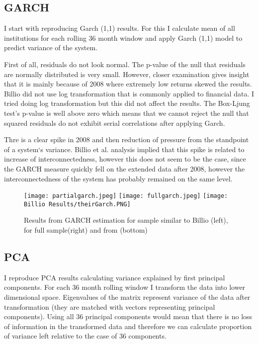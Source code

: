 \documentclass[preprint,pre,floats,aps,amsmath,amssymb]{revtex4}
\begin{document}
\subsection{GARCH}

I start with reproducing Garch (1,1) results.  For this I calculate mean of all institutions for each rolling 36 month window and apply Garch (1,1) model to predict variance of the system.

First of all, residuals do not look normal. The p-value of the null that residuals are normally distributed is very small. However, closer examination gives insight that it is mainly because of 2008 where extremely low returns skewed the results. Billio did not use log transformation that is commonly applied to financial data. I tried doing log transformation but this did not affect the results. 
The Box-Ljung test's p-value is well above zero which means that we cannot reject the null that squared residuals do not exhibit serial correlations after applying Garch. 

Thre is a clear spike in 2008 and then reduction of pressure from the standpoint of a system`s variance. Billio et al. analysis implied that this spike is related to increase of interconnectedness, however this does not seem to be the case, since the GARCH measure quickly fell on the extended data after 2008, however the interconnectedness of the system has probably remained on the same level. 



\begin{figure}[ht]
\texttt{[image: partialgarch.jpeg]}
\texttt{[image: fullgarch.jpeg]}
\texttt{[image: Billio Results/theirGarch.PNG]}
\caption{Results from GARCH estimation for sample similar to Billio (left), for full sample(right) and from \cite{billio} (bottom) }

\end{figure}


\subsection{PCA}
I reproduce PCA results calculating variance explained by first principal components. For each 36 month rolling window I transform the data into lower dimensional space. Eigenvalues of the matrix represent variance of the data after transformation (they are matched with vectors representing principal components). Using all 36 principal components would mean that there is no loss of information in the transformed data and therefore we can calculate proportion of variance left relative to the case of 36 components. 
\end{document}

